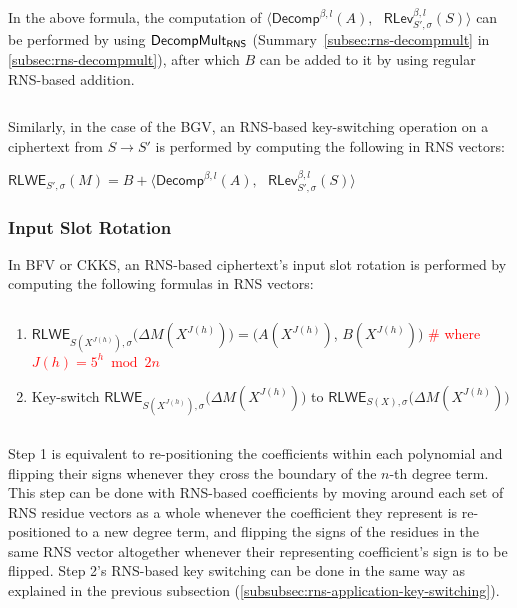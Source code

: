 $ $

In the above formula, the computation of $\bm{\langle} \textsf{Decomp}^{\beta, l}(A), \text{ } \textsf{RLev}_{S', \sigma}^{\beta, l}(S) \bm{\rangle}$ can be performed by using $\textsf{DecompMult\textsubscript{RNS}}$ (Summary~\ref*{subsec:rns-decompmult} in \autoref{subsec:rns-decompmult}), after which $B$ can be added to it by using regular RNS-based addition. 

$ $

Similarly, in the case of the BGV, an RNS-based key-switching operation on a ciphertext from $S \rightarrow S'$ is performed by computing the following in RNS vectors:

$\textsf{RLWE}_{S', \sigma}(M) = B + \bm{\langle} \textsf{Decomp}^{\beta, l}(A), \text{ } \textsf{RLev}_{S', \sigma}^{\beta, l}(S) \bm{\rangle}$


\subsubsection{Input Slot Rotation}
\label{subsubsec:rns-rotation}

In BFV or CKKS, an RNS-based ciphertext's input slot rotation is performed by computing the following formulas in RNS vectors: 

$ $

\begin{enumerate}
\item $ \textsf{RLWE}_{S(X^{J(h)}), \sigma}\bm(\Delta M(X^{J(h)})\bm) = \bm(A(X^{J(h)})$, $B(X^{J(h)})\bm)$ \textcolor{red}{ \# where $J(h) = 5^h \bmod 2n$}

\item Key-switch $\textsf{RLWE}_{S(X^{J(h)}), \sigma}\bm(\Delta M(X^{J(h)})\bm)$ to $\textsf{RLWE}_{S(X), \sigma}\bm(\Delta M(X^{J(h)})\bm)$
\end{enumerate}

$ $

Step 1 is equivalent to re-positioning the coefficients within each polynomial and flipping their signs whenever they cross the boundary of the $n$-th degree term. This step can be done with RNS-based coefficients by moving around each set of RNS residue vectors as a whole whenever the coefficient they represent is re-positioned to a new degree term, and flipping the signs of the residues in the same RNS vector altogether whenever their representing coefficient's sign is to be flipped. Step 2's RNS-based key switching can be done in the same way as explained in the previous subsection (\autoref{subsubsec:rns-application-key-switching}). 

